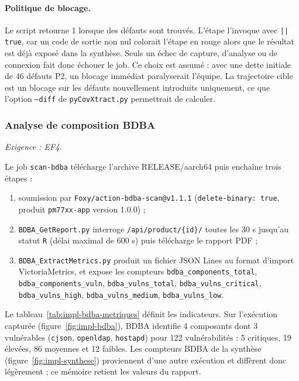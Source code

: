 \paragraph{Politique de blocage.} Le script retourne 1 lorsque des défauts sont
trouvés. L'étape l'invoque avec \texttt{|| true}, car un code de sortie non nul
colorait l'étape en rouge alors que le résultat est déjà exposé dans la
synthèse. Seuls un échec de capture, d'analyse ou de connexion fait donc échouer
le job. Ce choix est assumé : avec une dette initiale de 46 défauts P2, un
blocage immédiat paralyserait l'équipe. La trajectoire cible est un blocage sur
les défauts nouvellement introduits uniquement, ce que l'option \texttt{--diff}
de \texttt{pyCovXtract.py} permettrait de calculer.

\subsubsection{Analyse de composition BDBA}
\label{ssec:impl-bdba}

\emph{Exigence : EF4.}

Le job \texttt{scan-bdba} télécharge l'archive RELEASE/aarch64 puis enchaîne
trois étapes :

\begin{enumerate}[nosep]
  \item soumission par \texttt{Foxy/action-bdba-scan@v1.1.1}
        (\texttt{delete-binary: true}, produit \texttt{pm77xx-app} version 1.0.0) ;
  \item \texttt{BDBA\_GetReport.py} interroge \texttt{/api/product/\{id\}/} toutes
        les 30 s jusqu'au statut \texttt{R} (délai maximal de 600 s) puis télécharge
        le rapport PDF ;
  \item \texttt{BDBA\_ExtractMetrics.py} produit un fichier JSON Lines au format
        d'import VictoriaMetrics, et expose les compteurs
        \texttt{bdba\_components\_total}, \texttt{bdba\_components\_vuln},
        \texttt{bdba\_vulns\_total}, \texttt{bdba\_vulns\_critical},
        \texttt{bdba\_vulns\_high}, \texttt{bdba\_vulns\_medium},
        \texttt{bdba\_vulns\_low}.
\end{enumerate}

Le tableau~\ref{tab:impl-bdba-metriques} définit les indicateurs. Sur
l'exécution capturée (figure~\ref{fig:impl-bdba}), BDBA identifie 4 composants
dont 3 vulnérables (\texttt{cjson}, \texttt{openldap}, \texttt{hostapd}) pour
122 vulnérabilités : 5 critiques, 19 élevées, 86 moyennes et 12 faibles. Les
compteurs BDBA de la synthèse (figure~\ref{fig:impl-synthese}) proviennent d'une
autre exécution et diffèrent donc légèrement ; ce mémoire retient les valeurs
du rapport.

